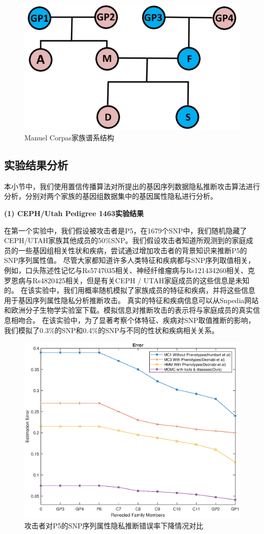 \begin{figure}[htbp]
	\centering
	\includegraphics[width=0.6\linewidth]{./figures/Manuel-Corpas-Family-Pedigree.jpg}
	\centering
	\caption{Manuel Corpas家族谱系结构}\label{fig:Manuel-Corpas-Family-Pedigree}
\end{figure}

\subsection{实验结果分析}

本小节中，我们使用置信传播算法对所提出的基因序列数据隐私推断攻击算法进行分析，分别对两个家族的基因组数据集中的基因属性隐私进行分析。

\textbf{(1) CEPH/Utah Pedigree 1463实验结果}

在第一个实验中，我们假设被攻击者是P5，在1679个SNP中，我们随机隐藏了CEPH/UTAH家族其他成员的50\%SNP。我们假设攻击者知道所观测到的家庭成员的一些基因组相关性状和疾病，尝试通过增加攻击者的背景知识来推断P5的SNP序列属性值。 尽管大家都知道许多人类特征和疾病都与SNP序列取值相关，例如，口头陈述性记忆与Rs5747035相关、神经纤维瘤病与Rs121434260相关、克罗恩病与Rs4820425相关，但是有关CEPH / UTAH家庭成员的这些信息是未知的。 在该实验中，我们用概率随机模拟了家族成员的特征和疾病，并将这些信息用于基因序列属性隐私分析推断攻击。 真实的特征和疾病信息可以从Snpedia网站和欧洲分子生物学实验室下载。模拟信息对推断攻击的表示将与家庭成员的真实信息相吻合。 在该实验中，为了显著考察个体特征、疾病对SNP取值推断的影响，我们模拟了0.3\%的SNP和0.4\%的SNP与不同的性状和疾病相关关系。

\begin{figure}[htbp]
	\centering
	\includegraphics[width=0.8\linewidth]{./figures/P5error1.eps}
	\centering
	\caption{攻击者对P5的SNP序列属性隐私推断错误率下降情况对比}\label{fig:P5error1}
\end{figure}


